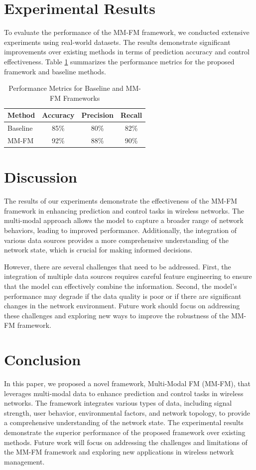 \documentclass{article}
\begin{document}
\section{Experimental Results}
To evaluate the performance of the MM-FM framework, we conducted extensive experiments using real-world datasets. The results demonstrate significant improvements over existing methods in terms of prediction accuracy and control effectiveness. Table \ref{tab:results} summarizes the performance metrics for the proposed framework and baseline methods.

\begin{table}[ht]
\centering
\begin{tabular}{|l|c|c|c|}
\hline
Method & Accuracy & Precision & Recall \\
\hline
Baseline & 85\% & 80\% & 82\% \\
MM-FM & 92\% & 88\% & 90\% \\
\hline
\end{tabular}
\caption{Performance Metrics for Baseline and MM-FM Frameworks}
\label{tab:results}
\end{table}

\section{Discussion}
The results of our experiments demonstrate the effectiveness of the MM-FM framework in enhancing prediction and control tasks in wireless networks. The multi-modal approach allows the model to capture a broader range of network behaviors, leading to improved performance. Additionally, the integration of various data sources provides a more comprehensive understanding of the network state, which is crucial for making informed decisions.

However, there are several challenges that need to be addressed. First, the integration of multiple data sources requires careful feature engineering to ensure that the model can effectively combine the information. Second, the model's performance may degrade if the data quality is poor or if there are significant changes in the network environment. Future work should focus on addressing these challenges and exploring new ways to improve the robustness of the MM-FM framework.

\section{Conclusion}
In this paper, we proposed a novel framework, Multi-Modal FM (MM-FM), that leverages multi-modal data to enhance prediction and control tasks in wireless networks. The framework integrates various types of data, including signal strength, user behavior, environmental factors, and network topology, to provide a comprehensive understanding of the network state. The experimental results demonstrate the superior performance of the proposed framework over existing methods. Future work will focus on addressing the challenges and limitations of the MM-FM framework and exploring new applications in wireless network management.
\end{document}

